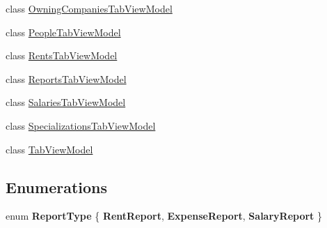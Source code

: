 \begin{DoxyCompactItemize}
class \hyperlink{class_baudi_1_1_client_1_1_view_models_1_1_tabs_view_models_1_1_owning_companies_tab_view_model}{Owning\+Companies\+Tab\+View\+Model}
\item 
class \hyperlink{class_baudi_1_1_client_1_1_view_models_1_1_tabs_view_models_1_1_people_tab_view_model}{People\+Tab\+View\+Model}
\item 
class \hyperlink{class_baudi_1_1_client_1_1_view_models_1_1_tabs_view_models_1_1_rents_tab_view_model}{Rents\+Tab\+View\+Model}
\item 
class \hyperlink{class_baudi_1_1_client_1_1_view_models_1_1_tabs_view_models_1_1_reports_tab_view_model}{Reports\+Tab\+View\+Model}
\item 
class \hyperlink{class_baudi_1_1_client_1_1_view_models_1_1_tabs_view_models_1_1_salaries_tab_view_model}{Salaries\+Tab\+View\+Model}
\item 
class \hyperlink{class_baudi_1_1_client_1_1_view_models_1_1_tabs_view_models_1_1_specializations_tab_view_model}{Specializations\+Tab\+View\+Model}
\item 
class \hyperlink{class_baudi_1_1_client_1_1_view_models_1_1_tabs_view_models_1_1_tab_view_model}{Tab\+View\+Model}
\end{DoxyCompactItemize}
\subsection*{Enumerations}
\begin{DoxyCompactItemize}
\item 
\hypertarget{namespace_baudi_1_1_client_1_1_view_models_1_1_tabs_view_models_af866867a926e1addcbbfecc19ae0acc4}{}enum {\bfseries Report\+Type} \{ {\bfseries Rent\+Report}, 
{\bfseries Expense\+Report}, 
{\bfseries Salary\+Report}
 \}\label{namespace_baudi_1_1_client_1_1_view_models_1_1_tabs_view_models_af866867a926e1addcbbfecc19ae0acc4}

\end{DoxyCompactItemize}

